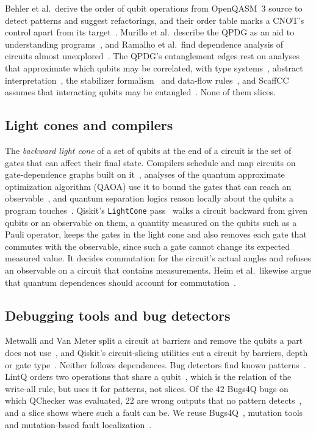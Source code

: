 Behler et al.\ derive the order of qubit operations from
OpenQASM~3 source to detect patterns and suggest refactorings, and their order table marks a CNOT's control apart
from its target~\cite{behler2024supporting, behler2025static}. Murillo et al.\ describe the QPDG as an aid to
understanding programs~\cite{murillo2025roadmap}, and Ramalho et al.\ find dependence analysis of circuits almost
unexplored~\cite{ramalho2025road}. The QPDG's entanglement edges rest on analyses that approximate which qubits may be correlated, with type
systems~\cite{perdrix2007types, prost2009reasoning, yuan2022twist}, abstract interpretation~\cite{perdrix2008entanglement,
yu2021abstract}, the stabilizer formalism~\cite{honda2015stabilizer} and data-flow rules~\cite{xia2025entanglement},
and ScaffCC assumes that interacting qubits may be entangled~\cite{javadiabhari2015scaffcc}. None of them slices.

\subsection{Light cones and compilers}
The \emph{backward light cone} of a set of qubits at the end of a circuit is the set of gates that can affect their
final state. Compilers schedule and map circuits on gate-dependence graphs built on it~\cite{murali2019triq,
amy2020staq}, analyses of the quantum approximate optimization algorithm (QAOA) use it to bound the gates that can
reach an observable~\cite{farhi2014qaoa}, and quantum
separation logics reason locally about the qubits a program touches~\cite{zhou2021qsl, le2022qsl}. Qiskit's
\texttt{LightCone} pass~\cite{qiskit2025} walks a circuit backward from given qubits or an observable on them, a quantity
measured on the qubits such as a Pauli operator, keeps the gates in the light cone and also removes each gate that
commutes with the observable, since such a gate cannot change its expected measured value. It decides commutation for the circuit's actual angles and refuses an observable on a circuit
that contains measurements. Heim et al.\ likewise argue that quantum dependences should account for
commutation~\cite{heim2020quantum}.

\subsection{Debugging tools and bug detectors}
Metwalli and Van Meter split a circuit at barriers and remove the qubits a part does not
use~\cite{metwalli2022debugging, metwalli2024testing}, and Qiskit's circuit-slicing utilities cut a circuit by
barriers, depth or gate type~\cite{qiskitaddonutils}. Neither follows dependences. Bug detectors find known
patterns~\cite{chen2023smelly, zhao2023qchecker, nayak2023qpac}. LintQ orders two operations that share a
qubit~\cite{paltenghi2024lintq}, which is the relation of the write-all rule, but uses it for patterns, not slices. Of
the 42 Bugs4Q bugs on which QChecker was evaluated, 22 are wrong outputs that no pattern
detects~\cite{zhao2023qchecker}, and a slice shows where such a fault can be. We reuse Bugs4Q~\cite{zhao2023bugs4q},
mutation tools~\cite{mendiluze2021muskit, fortunato2022qmutpy, garcia2022testing} and mutation-based fault
localization~\cite{ishimoto2025mbfl}.

